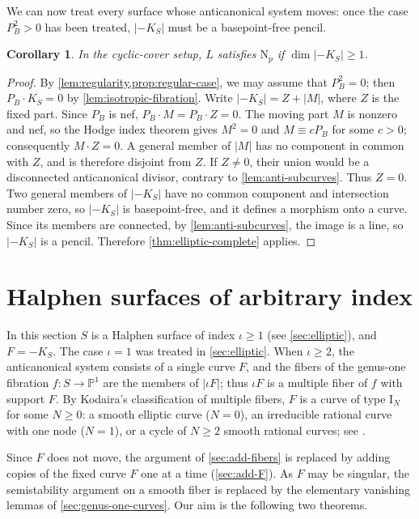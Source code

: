 \documentclass[11pt,reqno]{amsart}
\numberwithin{equation}{section}
\newtheorem{corollary}[corollary]{Corollary}
\theoremstyle{remark}
\newcommand{\prj}[1]{\mathbb{P}^{#1}}
\newcommand{\NP}{\mathrm N}
\begin{document}
We can now treat every surface whose anticanonical system moves: once the case \(P_B^2>0\) has been treated, \(|-K_S|\) must be a basepoint-free pencil.

\begin{corollary}\label{cor:moving-anti}
In the cyclic-cover setup, \(L\) satisfies \(\NP_p\) if \(\dim|-K_S|\geq1\).
\end{corollary}

\begin{proof}
By \cref{lem:regularity,prop:regular-case}, we may assume that \(P_B^2=0\); then \(P_B\cdot K_S=0\) by \cref{lem:isotropic-fibration}. Write \(|-K_S|=Z+|M|\), where \(Z\) is the fixed part. Since \(P_B\) is nef, \(P_B\cdot M=P_B\cdot Z=0\). The moving part \(M\) is nonzero and nef, so the Hodge index theorem gives \(M^2=0\) and \(M\equiv cP_B\) for some \(c>0\); consequently \(M\cdot Z=0\). A general member of \(|M|\) has no component in common with \(Z\), and is therefore disjoint from \(Z\). If \(Z\neq0\), their union would be a disconnected anticanonical divisor, contrary to \cref{lem:anti-subcurves}. Thus \(Z=0\). Two general members of \(|-K_S|\) have no common component and intersection number zero, so \(|-K_S|\) is basepoint-free, and it defines a morphism onto a curve. Since its members are connected, by \cref{lem:anti-subcurves}, the image is a line, so \(|-K_S|\) is a pencil. Therefore \cref{thm:elliptic-complete} applies.
\end{proof}

\section{Halphen surfaces of arbitrary index}\label{sec:halphen}

In this section \(S\) is a Halphen surface of index \(\iota\geq1\) (see \cref{sec:elliptic}), and \(F=-K_S\). The case \(\iota=1\) was treated in \cref{sec:elliptic}. When \(\iota\geq2\), the anticanonical system consists of a single curve \(F\), and the fibers of the genus-one fibration \(f\colon S\to\prj{1}\) are the members of \(|\iota F|\); thus \(\iota F\) is a multiple fiber of \(f\) with support \(F\). By Kodaira's classification of multiple fibers, \(F\) is a curve of type \(\mathrm I_N\) for some \(N\geq0\): a smooth elliptic curve (\(N=0\)), an irreducible rational curve with one node (\(N=1\)), or a cycle of \(N\geq2\) smooth rational curves; see \cite[Proposition~2.2 and Section~2.2]{CantatDolgachev}.

Since \(F\) does not move, the argument of \cref{sec:add-fibers} is replaced by adding copies of the fixed curve \(F\) one at a time (\cref{sec:add-F}). As \(F\) may be singular, the semistability argument on a smooth fiber is replaced by the elementary vanishing lemmas of \cref{sec:genus-one-curves}. Our aim is the following two theorems.
\end{document}
